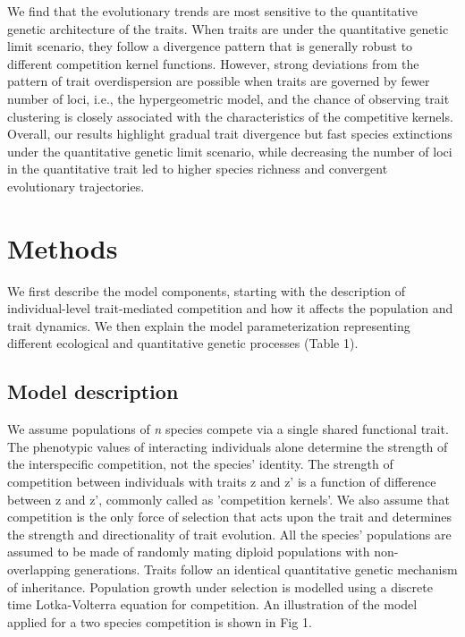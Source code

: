 \documentclass[12pt]{article}
\begin{document}
We find that the evolutionary trends are most sensitive to the quantitative genetic architecture of the traits. When traits are under the quantitative genetic limit scenario, they follow a divergence pattern that is generally robust to different competition kernel functions. However, strong deviations from the pattern of trait overdispersion are possible when traits are governed by fewer number of loci, i.e., the hypergeometric model, and the chance of observing trait clustering is closely associated with the characteristics of the competitive kernels. Overall, our results highlight gradual trait divergence but fast species extinctions under the quantitative genetic limit scenario, while decreasing the number of loci in the quantitative trait led to higher species richness and convergent evolutionary trajectories.\par


\section{Methods}

We first describe the model components, starting with the description of individual-level trait-mediated competition and how it affects the population and trait dynamics. We then explain the model parameterization representing different ecological and quantitative genetic processes (Table 1).\par


\subsection{Model description}

We assume populations of \emph{n} species compete via a single shared functional trait. The phenotypic values of interacting individuals alone determine the strength of the interspecific competition, not the species’ identity. The strength of competition between individuals with traits z and z’ is a function of difference between z and z’, commonly called as 'competition kernels'. We also assume that competition is the only force of selection that acts upon the trait and determines the strength and directionality of trait evolution. All the species’ populations are assumed to be made of randomly mating diploid populations with non-overlapping generations. Traits follow an identical quantitative genetic mechanism of inheritance. Population growth under selection is modelled using a discrete time Lotka-Volterra equation for competition. An illustration of the model applied for a two species competition is shown in Fig 1.
\end{document}

